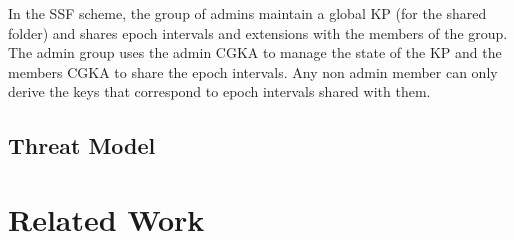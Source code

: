 In the SSF scheme, the group of admins maintain a global KP (for the shared folder)
and shares epoch intervals and extensions with the members of the group.
The admin group uses the admin CGKA to manage the state of the KP and the members
CGKA to share the epoch intervals. 
Any non admin member can only derive the keys
that correspond to epoch intervals shared with them.

\subsection{Threat Model}

\section{Related Work}\label{sc:related-work}





